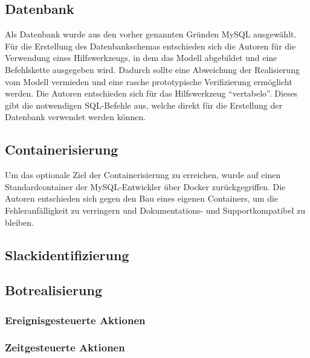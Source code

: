 \subsection{Datenbank}

Als Datenbank wurde aus den vorher genannten Gründen MySQL ausgewählt.
Für die Erstellung des Datenbankschemas entschieden sich die Autoren für die Verwendung eines Hilfswerkzeugs, in dem das Modell abgebildet und eine Befehlskette ausgegeben wird. Dadurch sollte eine Abweichung der Realisierung vom Modell vermieden und eine rasche prototypische Verifizierung ermöglicht werden. Die Autoren entschieden sich für das Hilfswerkzeug \enquote{vertabelo}. Dieses gibt die notwendigen SQL-Befehle aus, welche direkt für die Erstellung der Datenbank verwendet werden können.





\subsection{Containerisierung}

Um das optionale Ziel der Containerisierung zu erreichen, wurde auf einen Standardcontainer der MySQL-Entwickler über Docker zurückgegriffen. Die Autoren entschieden sich gegen den Bau eines eigenen Containers, um die Fehleranfälligkeit zu verringern und Dokumentations- und Supportkompatibel zu bleiben.







\subsection{Slackidentifizierung}


\subsection{Botrealisierung}
\subsubsection{Ereignisgesteuerte Aktionen}
\subsubsection{Zeitgesteuerte Aktionen}





